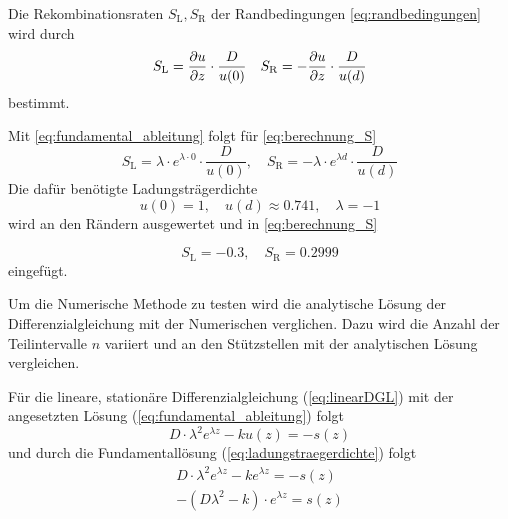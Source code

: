 Die Rekombinationsraten $S_\mathrm{L},S_\mathrm{R}$ der Randbedingungen
\cref{eq:randbedingungen} wird durch
\begin{equation}\label{eq:berechnung_S}
	S_\mathrm{L}=\pdv{u}{z}\cdot\frac{D}{u(0)} \quad
	S_\mathrm{R}=-\pdv{u}{z}\cdot \frac{D}{u(d)}
\end{equation}
bestimmt.

Mit \cref{eq:fundamental_ableitung} folgt für \cref{eq:berechnung_S}
\begin{equation}
	S_\mathrm{L}=\lambda \cdot e^{\lambda \cdot 0}\cdot\frac{D}{u(0)},\quad	S_\mathrm{R}=-\lambda \cdot e^{\lambda d}\cdot\frac{D}{u(d)}
\end{equation} 
Die dafür benötigte Ladungsträgerdichte
\begin{equation}
	u(0)=1, \quad u(d)\approx0.741,\quad  \lambda=-1
\end{equation}
wird an den Rändern ausgewertet und in \cref{eq:berechnung_S} 

\begin{equation}
	S_\mathrm{L}=-0.3,\quad S_\mathrm{R}=0.2999
\end{equation}
eingefügt.

Um die Numerische Methode zu testen wird die analytische Lösung der Differenzialgleichung mit der Numerischen verglichen.
Dazu wird die Anzahl der Teilintervalle $n$ variiert und an den Stützstellen mit der analytischen Lösung vergleichen.

Für die lineare, stationäre Differenzialgleichung (\cref{eq:linearDGL}) mit der angesetzten Lösung (\cref{eq:fundamental_ableitung}) folgt
\begin{equation}
	D\cdot\lambda^2 e^{\lambda z}-ku(z)=-s(z)
\end{equation}
und durch die Fundamentallösung (\cref{eq:ladungstraegerdichte}) folgt 
\begin{equation}
	\begin{split}
		D\cdot\lambda^2 e^{\lambda z}-ke^{\lambda z}=-s(z) \\
		-\left(D\lambda^2-k\right)\cdot e^{\lambda z}=s(z)
	\end{split}
\end{equation}

